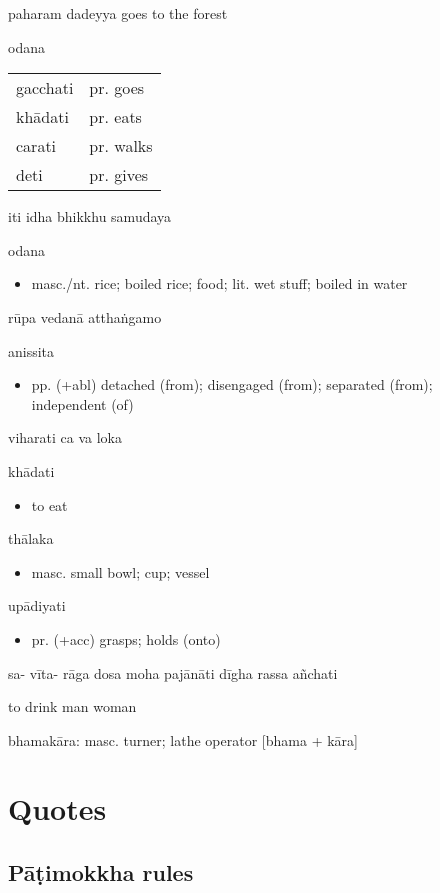 \documentclass[11pt,oneside]{memoir}
\begin{document}
paharam dadeyya
goes to the forest

odana


\begin{center}
\begin{tabular}{ll}
gacchati & pr. goes\\[0pt]
khādati & pr. eats\\[0pt]
carati & pr. walks\\[0pt]
deti & pr. gives\\[0pt]
\end{tabular}
\end{center}

iti
idha
bhikkhu
samudaya

odana
\begin{itemize}
\item masc./nt. rice; boiled rice; food; lit. wet stuff; boiled in water
\end{itemize}

rūpa
vedanā
atthaṅgamo

anissita
\begin{itemize}
\item pp. (+abl) detached (from); disengaged (from); separated (from); independent (of)
\end{itemize}

viharati
ca
va
loka

khādati
\begin{itemize}
\item to eat
\end{itemize}

thālaka
\begin{itemize}
\item masc. small bowl; cup; vessel
\end{itemize}

upādiyati
\begin{itemize}
\item pr. (+acc) grasps; holds (onto)
\end{itemize}

sa-
vīta-
rāga
dosa
moha
pajānāti
dīgha
rassa
añchati

to drink
man
woman

bhamakāra: masc. turner; lathe operator [bhama + kāra]

\section{Quotes}
\label{sec:orge60f1c0}
\subsection{Pāṭimokkha rules}
\label{sec:org46d4cfe}
\end{document}
